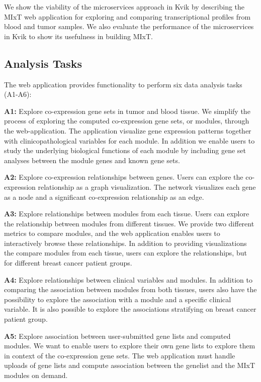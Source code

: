 We show the viability of the microservices approach in Kvik by describing the
MIxT web application for exploring and comparing transcriptional profiles from
blood and tumor samples. We also evaluate the performance of the microservices
in Kvik to show its usefulness in building MIxT. 

\subsection*{Analysis Tasks}

The web application provides functionality to perform six data analysis tasks
(A1-A6):

\textbf{A1:} Explore co-expression gene sets in tumor and blood tissue. 
We
simplify the process of exploring the computed co-expression gene sets, or
modules, through the web-application. The application
visualize gene expression patterns together with clinicopathological variables
for each module. In addition we enable users to study the underlying
biological functions of each module by including gene set analyses between the
module genes and known gene sets. 

\textbf{A2:} Explore co-expression relationships between genes. Users can
explore the co-expression relationship as a graph visualization. The network
visualizes each gene as a node and a significant co-expression relationship as
an edge.  

\textbf{A3:} Explore relationships between modules from each tissue. Users can
explore the relationship between modules from different tissues. We
provide two different metrics to compare modules, and the web application
enables users to interactively browse these relationships. In addition to
providing visualizations the compare modules from each tissue, users 
can explore the relationships, but for different breast cancer patient
groups. 

\textbf{A4:} Explore relationships between clinical variables and modules. In
addition to comparing the association between modules from both tissues, users
also have the possibility to explore the association with a module and a
specific clinical variable. It is also possible to explore the associations
stratifying on breast cancer patient group.

\textbf{A5:} Explore association between user-submitted gene lists and computed
modules. We want to enable users to explore their own gene lists to explore
them in context of the co-expression gene sets. The web application must handle
uploads of gene lists and compute association between the genelist and the MIxT
modules on demand. 


